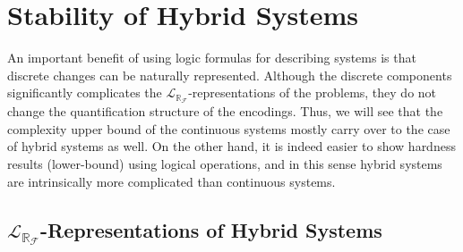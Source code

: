\documentclass[12pt]{article}
\theoremstyle{plain}
\theoremstyle{definition}
\newcommand{\lrf}{\mathcal{L}_{\mathbb{R}_{\mathcal{F}}}}
\begin{document}
\section{Stability of Hybrid Systems}

An important benefit of using logic formulas for describing systems is that discrete changes can be naturally represented.  Although the discrete components significantly complicates the $\lrf$-representations of the problems, they do not change the quantification structure of the encodings. Thus, we will see that the complexity upper bound of the continuous systems mostly carry over to the case of hybrid systems as well. On the other hand, it is indeed easier to show hardness results (lower-bound) using logical operations, and in this sense hybrid systems are intrinsically more complicated than continuous systems.

\subsection{{\large$\lrf$}-Representations of Hybrid Systems}\label{language}
\end{document}
